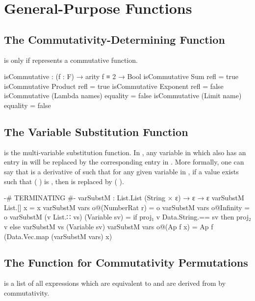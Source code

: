 \documentclass{report}
\begin{document}
\chapter{General-Purpose Functions}

\section{The Commutativity-Determining Function}
   is  only if  represents a commutative function.

\begin{code}
  isCommutative : (f : F) → arity f ≡ 2 → Bool
  isCommutative Sum refl = true
  isCommutative Product refl = true
  isCommutative Exponent refl = false
  isCommutative (Lambda names) equality = false
  isCommutative (Limit name) equality = false
\end{code}

\section{The Variable Substitution Function}\label{sec:varSubstM-def}
 is the multi-variable substitution function.  In   , any variable in  which also has an entry in  will be replaced by the corresponding  entry in .  More formally, one can say that    is a derivative of  such that for any given variable  in , if a value  exists such that  \AgdaSymbol(  \AgdaSymbol) is , then  is replaced by  \AgdaSymbol(  \AgdaSymbol).

\begin{code}
  {-# TERMINATING #-}
  varSubstM : List.List (String × ε) → ε → ε
  varSubstM List.[] x = x
  varSubstM vars o@(NumberRat r) = o
  varSubstM vars o@Infinity = o
  varSubstM (v List.∷ vs) (Variable sv) =
    if proj₁ v Data.String.== sv
       then proj₂ v
       else varSubstM vs (Variable sv)
  varSubstM vars o@(Ap f x) = Ap f (Data.Vec.map (varSubstM vars) x)
\end{code}

\section{The Function for Commutativity Permutations}
  is a list of all expressions which are equivalent to  and are derived from  by commutativity.
\end{document}
